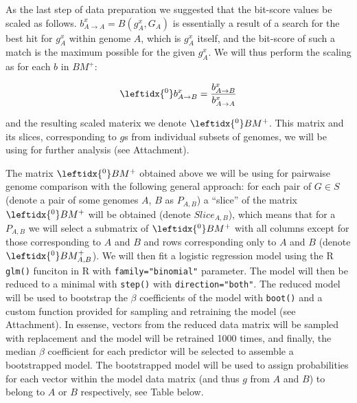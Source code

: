 As the last step of data preparation we suggested that the bit-score values be
scaled as follows. $b_{A \rightarrow A}^x = B(g_A^x, G_A)$ is essentially a
result of a search for the best hit for $g_A^x$ within genome $A$, which is
$g_A^x$ itself, and the bit-score of such a match is the maximum possible for
the given $g_A^x$. We will thus perform the scaling as for each $b$ in $BM^+$:

\begin{equation}
\leftidx{^0}b_{A \rightarrow B}^x = \dfrac{b_{A \rightarrow B}^x}{b_{A \rightarrow
A}^x}
\end{equation}

\newcommand{\bmzp}{\leftidx{^0}BM^+}

and the resulting scaled materix we denote $\leftidx{^0}BM^+$. This matrix and
its slices, corresponding to $g$s from individual subsets of genomes, we will
be using for further analysis (see Attachment).

The matrix $\bmzp{}$ obtained above we will be using for pairwaise genome
comparison with the following general approach:
for each pair of $G \in S$ (denote a pair of some genomes $A$, $B$ as
$P_{A,B}$) a ``slice'' of the matrix $\bmzp{}$
will be obtained (denote $Slice_{A,B}$), which means that for a $P_{A,B}$ we
will select a submatrix of $\bmzp{}$ with all columns except for those
corresponding to $A$ and $B$ and rows corresponding only to $A$ and $B$ (denote
$\leftidx{^0}BM_{A,B}^+$).
\newcommand{\bmzpab}{\leftidx{^0}BM_{A,B}^+}
We will then fit a logistic regression model using the R {\tt glm{()}} funciton
in R with {\tt family="binomial"} parameter. The model will then be reduced to
a minimal with {\tt step()} with {\tt direction="both"}. The reduced model will
be used to bootstrap the $\beta$ coefficients of the model with {\tt boot()} and
a custom function provided for sampling and retraining the model (see
Attachment). In essense, vectors from the reduced data matrix will be
sampled with replacement and the model will be retrained 1000 times, and
finally, the median $\beta$ coefficient for each predictor will be selected to
assemble a bootstrapped model. The bootstrapped model will be used to assign
probabilities for each vector within the model data matrix (and thus $g$ from
$A$ and $B$) to belong to $A$ or $B$ respectively, see Table below.
